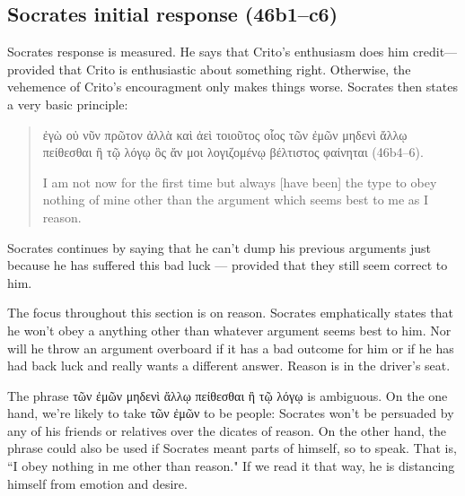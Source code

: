 \documentclass[11pt]{article}
\begin{document}

\subsection{Socrates initial response (46b1--c6)}

Socrates response is measured. He says that Crito's enthusiasm does him
credit---provided that Crito is enthusiastic about something right.
Otherwise, the vehemence of Crito's encouragment only makes things worse.
Socrates then states a very basic principle:

\begin{quote}
    {\g
    ἐγὼ οὐ νῦν πρῶτον ἀλλὰ καὶ ἀεὶ τοιοῦτος οἷος τῶν ἐμῶν μηδενὶ ἄλλῳ
    πείθεσθαι ἢ τῷ λόγῳ ὃς ἄν μοι λογιζομένῳ βέλτιστος φαίνηται
    } (46b4--6).

    I am not now for the first time but always [have been] the type to obey
    nothing of mine other than the argument which seems best to me as
    I reason.
\end{quote}

Socrates continues by saying that he can't dump his previous arguments just
because he has suffered this bad luck --- provided that they still seem
correct to him.

The focus throughout this section is on reason.  Socrates emphatically
states that he won't obey a anything other than whatever argument seems
best to him.  Nor will he throw an argument overboard if it has a bad
outcome for him or if he has had back luck and really wants a different
answer.  Reason is in the driver's seat.

The phrase {\g τῶν ἐμῶν μηδενὶ ἄλλῳ πείθεσθαι ἢ τῷ λόγῳ} is ambiguous.  On
the one hand, we're likely to take {\g τῶν ἐμῶν} to be people: Socrates
won't be persuaded by any of his friends or relatives over the dicates of
reason.  On the other hand, the phrase could also be used if Socrates meant
parts of himself, so to speak. That is, ``I obey nothing in me other than
reason."  If we read it that way, he is distancing himself from emotion and
desire.
\end{document}
